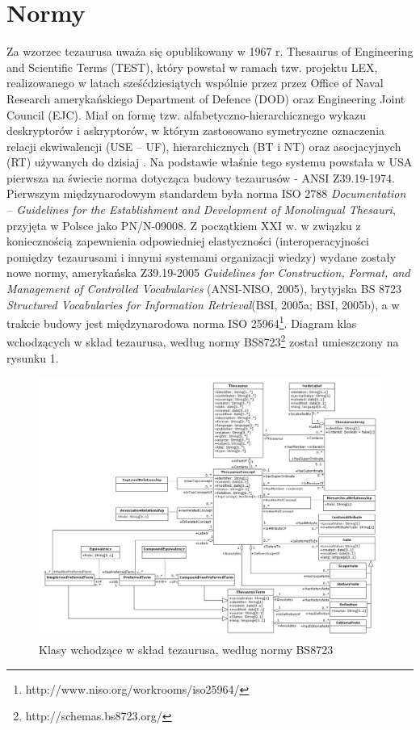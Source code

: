 \documentclass[12pt,a4paper,notitlepage]{article}
\begin{document}
\section{Normy}
Za wzorzec tezaurusa uważa się opublikowany w 1967 r. Thesaurus of Engineering and Scientific Terms (TEST), który powstał w ramach tzw. projektu LEX, realizowanego w latach sześćdziesiątych wspólnie przez przez Office of Naval Research amerykańskiego Department of Defence (DOD) oraz Engineering Joint Council (EJC). Miał on formę tzw. alfabetyczno-hierarchicznego wykazu deskryptorów i askryptorów, w którym zastosowano symetryczne oznaczenia relacji ekwiwalencji (USE – UF), hierarchicznych (BT i NT) oraz asocjacyjnych (RT) używanych do dzisiaj \cite{Sosinska}. Na podstawie właśnie tego systemu powstała w USA pierwsza na świecie norma dotycząca budowy tezaurusów - ANSI Z39.19-1974.
Pierwszym międzynarodowym standardem była norma ISO 2788 \textit{Documentation – Guidelines for the Establishment and Development of Monolingual Thesauri}, przyjęta w Polsce jako PN/N-09008. Z początkiem XXI w. w związku z koniecznością zapewnienia odpowiedniej elastyczności (interoperacyjności pomiędzy tezaurusami i innymi systemami organizacji wiedzy) wydane zostały nowe normy, amerykańska Z39.19-2005 \textit{Guidelines for Construction, Format, and Management of Controlled Vocabularies} (ANSI-NISO, 2005), brytyjska BS 8723 \textit{Structured Vocabularies for Information Retrieval}(BSI, 2005a; BSI, 2005b), a w trakcie budowy jest międzynarodowa norma ISO 25964\footnote{http://www.niso.org/workrooms/iso25964/}.
Diagram klas wchodzących w skład tezaurusa, według normy BS8723\footnote{http://schemas.bs8723.org/} został umieszczony na rysunku 1. 

\begin{figure}[ht]
\centering
\includegraphics[width=13cm]{./Model.pdf}
\caption{Klasy wchodzące w skład tezaurusa, według normy BS8723}
\end{figure}
\end{document}
